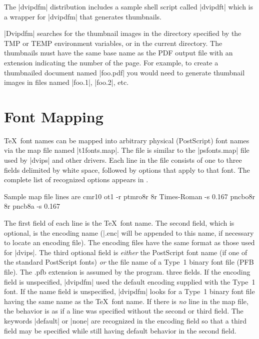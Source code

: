 {The |dvipdfm| distribution includes a sample
shell script called |dvipdft| which is a wrapper
for |dvipdfm| that generates thumbnails.

|Dvipdfm| searches for the thumbnail images
in the directory specified by the TMP or TEMP
environment variables, or in the current directory.
The thumbnails must have the same base name as the PDF output
file with an extension indicating the number of the page.
For example, to create a thumbnailed document named |foo.pdf|
you would need to generate thumbnail images in files named
|foo.1|, |foo.2|, etc.

\section{Font Mapping}
\TeX\ font names can be
mapped into arbitrary physical (PostScript) font names via
the map file named |t1fonts.map|.  The file is
similar to the |psfonts.map| file used by |dvips|
and other drivers.  Each line in the
file consists of one to three fields delimited
by white space, followed by options that apply to that font.
The complete list of recognized options
appears in .

Sample map file lines are\nobreak
\begintt
cmr10 ot1 -r
ptmro8r 8r Times-Roman -s 0.167
pncbo8r 8r pncb8a -s 0.167
\endtt

The first field of each line
is the \TeX\ font name.  The second
field, which is optional, is the encoding name (|.enc| will
be appended to this name, if necessary
to locate an encoding file).  The
encoding files have the same format
as those used for |dvips|.
The third optional field is {\it either} the PostScript font
name (if one of the standard PostScript fonts) {\it or}
the file name of a Type~1 binary font file (PFB file).
The {}.pfb extension is assumed by the program.
three fields. If the encoding field is unspecified,
|dvipdfm| used the default encoding supplied with
the Type~1 font.  If the name field is unspecified,
|dvipdfm| looks for a Type~1 binary font file
having the same name as the \TeX\ font name.
If there is {\it no} line in the map file,
the behavior is as if a line was specified
without the second or third field.
The keywords |default| or |none| are
recognized in the encoding field so that
a third field may be specified while still
having default behavior in the second field.

}
